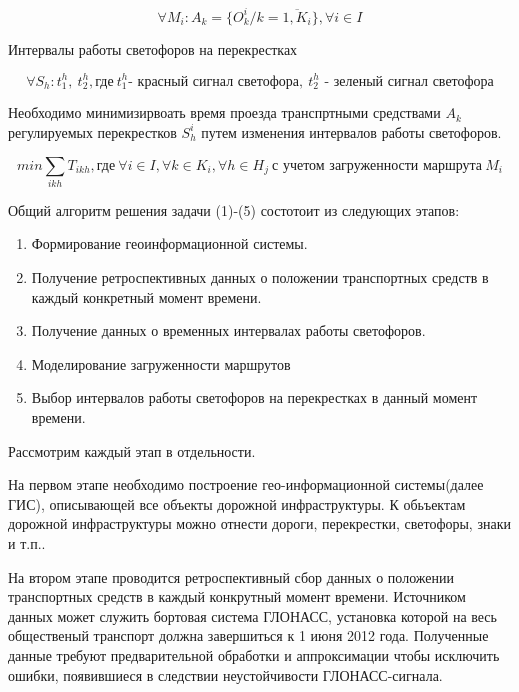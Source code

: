 \documentclass[a4paper,13pt]{article}
\begin{document}
\begin{equation}\label{eq:objects}
\forall M_i :A_k = \{ O^i_{k}/k = \overline{1,K_i} \}, \forall{i} \in I
\end{equation}

Интервалы работы светофоров на перекрестках

\begin{equation}\label{eq:crosstime}
\forall S_h :t^h_{1},\ t^h_{2}, \text{где} \ t^h_{1}\text{- красный сигнал светофора}, \ t^h_{2}\text{ - зеленый сигнал светофора}
\end{equation}

Необходимо минимизирвоать время проезда транспртными средствами \begin{math}A_k\end{math} регулируемых перекрестков \begin{math}S^i_{h}\end{math} путем изменения интервалов работы светофоров.

\begin{equation}\label{eq:crosstimemin}
min \sum_{ikh} T_{ikh}, \text{где}\ \forall i \in I, \forall k \in K_i, \forall h \in H_j \ \text{с учетом загруженности маршрута}\ M_i
\end{equation}

Общий алгоритм решения задачи (1)-(5) состотоит из следующих этапов:
\begin{enumerate}
\item Формирование геоинформационной системы.
\item Получение ретроспективных данных о положении транспортных средств в каждый конкретный момент времени.
\item Получение данных о временных интервалах работы светофоров.
\item Моделирование загруженности маршрутов
\item Выбор интервалов работы светофоров на перекрестках в данный момент времени.
\end{enumerate}

Рассмотрим каждый этап в отдельности.

На первом этапе необходимо построение гео-информационной системы(далее ГИС), описывающей все объекты дорожной инфраструктуры. К обьъектам дорожной инфраструктуры можно отнести дороги, перекрестки, светофоры, знаки и т.п..

На втором этапе проводится ретроспективный сбор данных о положении транспортных средств в каждый конкрутный момент времени. Источником данных может служить бортовая система ГЛОНАСС, установка которой на весь общественый транспорт должна завершиться к 1 июня 2012 года. Полученные данные требуют предварительной обработки и аппроксимации чтобы исключить ошибки, появившиеся в следствии неустойчивости ГЛОНАСС-сигнала.
\end{document}
